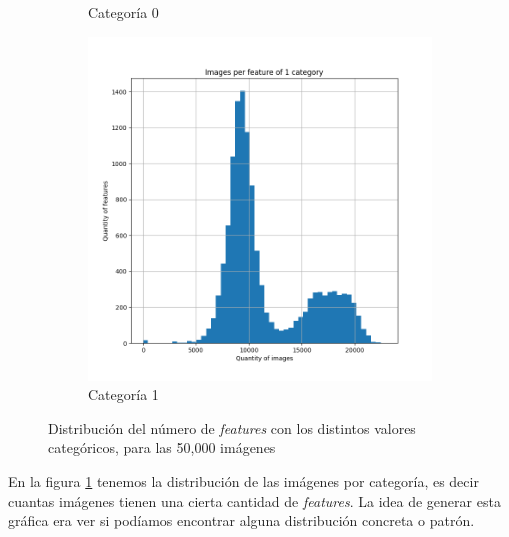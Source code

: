 \documentclass[12,twoside]{TFG-GM}
\theoremstyle{definition}
\theoremstyle{remark}
\begin{document}
\begin{figure}[ht]
\begin{subfigure}[b]{0.3\textwidth}
		\caption{Categoría 0}
	\end{subfigure}
	\begin{subfigure}[b]{0.3\textwidth}
		\includegraphics[width=\textwidth]  {Images/plots/25/Images_per_feature_of_1_category.png}
		\caption{Categoría 1}
	\end{subfigure}       
	\caption{Distribución del número de \textit{features} con los distintos valores categóricos, para las 50,000 imágenes  \label{fig:imagesperfeature}}
\end{figure}

En la figura \ref{fig:imagesperfeature} tenemos la distribución de las imágenes por categoría, es decir cuantas imágenes tienen una cierta cantidad de \textit{features}. La idea de generar esta gráfica era ver si podíamos encontrar alguna distribución concreta o patrón. %
\end{document}
